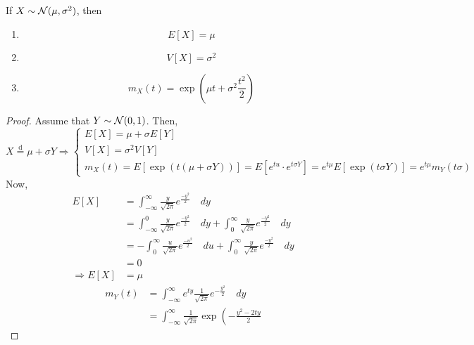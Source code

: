 \begin{theorem}
If $X \sim \mathcal{N}(\mu, \sigma^2)$, then
\begin{enumerate}[noitemsep, topsep=0em]
\item
\[
    E[X] = \mu
\]
\item
\[
    V[X] = \sigma^2
\]
\item
\[
    m_X(t) = \exp \left( \mu t + \sigma^2 \frac{t^2}{2} \right)
\]    
\end{enumerate}
\end{theorem}
\begin{proof}
Assume that $Y \sim \mathcal{N}(0, 1)$. Then,
\[
    X \overset{\text{d}}{=} \mu + \sigma Y
    \Rightarrow \begin{cases}
        E[X] = \mu + \sigma E[Y]                                           \\
        V[X] = \sigma^2 V[Y]                                               \\
        m_X(t) = E [\exp(t(\mu + \sigma Y))] = E[e^{tu} \cdot e^{t \sigma Y}]
               = e^{t\mu} E[\exp(t \sigma Y)]
               = e^{t\mu} m_Y(t \sigma)
    \end{cases}
\]
Now,
\begin{align*}
    E[X] &= \int_{-\infty}^{\infty} \frac{y}{\sqrt{2 \pi}} e^{\frac{-y^2}{2}}
            \quad dy                                                       \\
         &= \int_{-\infty}^{0} \frac{y}{\sqrt{2 \pi}} e^{\frac{-y^2}{2}} \quad
            dy +
            \int_{0}^{\infty} \frac{y}{\sqrt{2 \pi}} e^{\frac{-y^2}{2}} \quad
            dy                                                             \\
         &= -\int_{0}^{\infty} \frac{u}{\sqrt{2 \pi}} e^{\frac{-u^2}{2}}
            \quad du +
            \int_{0}^{\infty} \frac{y}{\sqrt{2 \pi}} e^{\frac{-y^2}{2}} \quad
            dy                                                             \\
         &= 0                                                              \\
    \Rightarrow E[X] &= \mu
\end{align*}
\begin{align*}
    m_Y(t) &= \int_{-\infty}^{\infty} e^{ty} \frac{1}{\sqrt{2\pi}}
              e^{-\frac{y^2}{2}} \quad dy                                  \\
           &= \int_{-\infty}^{\infty} \frac{1}{\sqrt{2\pi}}
              \exp \left(
                  -\frac{y^2 - 2ty}{2}

\end{align*}
\end{proof}
